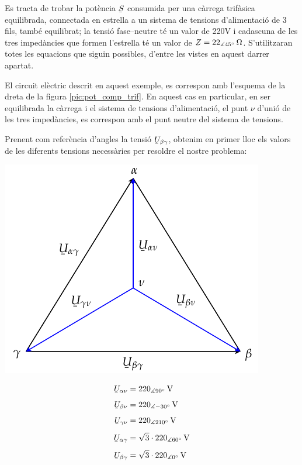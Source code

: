 \begin{exemple}
    Es tracta de trobar la pot\`{e}ncia $\cmplx{S}$ consumida per una c\`{a}rrega
    trif\`{a}sica equilibrada, connectada en estrella a un sistema de tensions
    d'alimentaci\'{o}  de 3 fils, tamb\'{e} equilibrat; la tensi\'{o} fase--neutre
    t\'{e} un valor de 220\unit{V} i cadascuna de les tres  imped\`{a}ncies
    que formen l'estrella t\'{e} un valor de $\cmplx{Z}=22_{\measuredangle
    45\degree}\unit{\ohm}$. S'utilitzaran totes les equacions que
    siguin possibles, d'entre les vistes en aquest darrer apartat.

    El circuit el\`{e}ctric descrit en aquest exemple, es correspon amb
    l'esquema de la dreta de la figura \vref{pic:pot_comp_trif}. En
    aquest cas en particular, en ser equilibrada la c\`{a}rrega i el
    sistema de tensions d'alimentaci\'{o}, el punt $\nu$ d'uni\'{o} de  les tres imped\`{a}ncies, es
    correspon amb el punt neutre del sistema de tensions.

    Prenent com refer\`{e}ncia d'angles la tensi\'{o}
    $\cmplx{U}_{\beta\gamma}$, obtenim en primer lloc els valors de
    les diferents tensions necess\`{a}ries per resoldre el nostre
    problema:

    \hfill
    \begin{minipage}[b]{7.5cm}
        \includegraphics{Imatges/Cap-Fonaments-Potencia-Exemple.pdf}
    \end{minipage}
    \hfill
    \begin{minipage}[b][5.7cm][t]{3.8cm}
    \begin{align*}
        \cmplx{U}_{\alpha\nu} &= 220_{\measuredangle 90\degree}\unit{V} \\[1ex]
        \cmplx{U}_{\beta\nu} &= 220_{\measuredangle -30\degree}\unit{V} \\[1ex]
        \cmplx{U}_{\gamma\nu} &= 220_{\measuredangle 210\degree}\unit{V} \\[1ex]
        \cmplx{U}_{\alpha\gamma} &= \sqrt{3}\cdot220_{\measuredangle 60\degree}\unit{V} \\[1ex]
        \cmplx{U}_{\beta\gamma} &= \sqrt{3}\cdot220_{\measuredangle 0\degree}\unit{V}
    \end{align*}
    \end{minipage}
    \hfill{}


\end{exemple}
